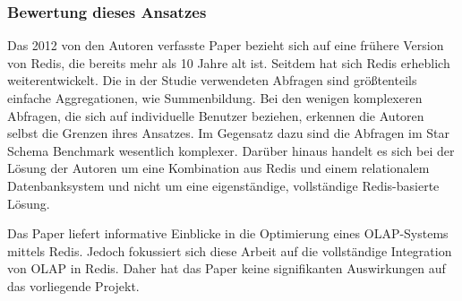 \subsubsection{Bewertung dieses Ansatzes}
Das 2012 von den Autoren verfasste Paper bezieht sich auf eine frühere Version von Redis, die bereits mehr als 10 Jahre alt ist.
Seitdem hat sich Redis erheblich weiterentwickelt.
Die in der Studie verwendeten Abfragen sind größtenteils einfache Aggregationen, wie Summenbildung.
Bei den wenigen komplexeren Abfragen, die sich auf individuelle Benutzer beziehen, erkennen die Autoren selbst die Grenzen ihres Ansatzes.
Im Gegensatz dazu sind die Abfragen im Star Schema Benchmark wesentlich komplexer.
Darüber hinaus handelt es sich bei der Lösung der Autoren um eine Kombination aus Redis und einem relationalem Datenbanksystem und nicht um eine eigenständige, vollständige Redis-basierte Lösung.

Das Paper liefert informative Einblicke in die Optimierung eines OLAP-Systems mittels Redis. Jedoch fokussiert sich diese Arbeit auf die vollständige Integration von OLAP in Redis. Daher hat das Paper keine signifikanten Auswirkungen auf das vorliegende Projekt.

 